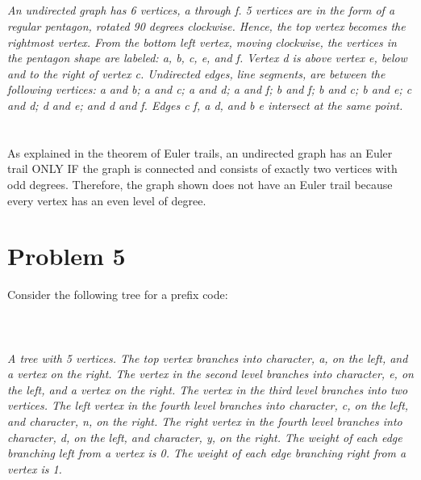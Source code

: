 \documentclass{amsart}
\theoremstyle{definition}
\theoremstyle{Exercise}
\theoremstyle{remark}
\theoremstyle{rule}
\numberwithin{equation}{section}
\begin{document}
\begin{enumerate}[label=(\alph*)]
\begin{enumerate}[label=(\roman*)]
{}
\\\\
\vspace*{0.2in}
\\\\
{\color{blue}{\bf Figure 12:} \emph{An undirected graph has 6 vertices, a through f. 5 vertices are in the form of a regular pentagon, rotated 90 degrees clockwise. Hence, the top vertex becomes the rightmost vertex. From the bottom left vertex, moving clockwise, the vertices in the pentagon shape are labeled: a, b, c, e, and f. Vertex d is above vertex e, below and to the right of vertex c. Undirected edges, line segments, are between the following vertices: a and b; a and c; a and d; a and f; b and f; b and c; b and e; c and d; d and e; and d and f. Edges c f, a d, and b e intersect at the same point.
\\
}
}
\\\\
As explained in the theorem of Euler trails, an undirected graph has an Euler trail ONLY IF the graph is connected and consists of exactly
two vertices with odd degrees. Therefore, the graph shown does not have an Euler trail because every vertex has an even level of degree.\\

\end{enumerate}
\end{enumerate}
 \newpage
\vspace*{0.2in}
\section*{Problem 5}

Consider the following tree for a prefix code:\\\\
\\\\
{\color{blue}{\bf Figure 13:} \emph{A tree with 5 vertices. The top vertex branches into character, a, on the left, and a vertex on the right. The vertex in the second level branches into character, e, on the left, and a vertex on the right. The vertex in the third level branches into two vertices. The left vertex in the fourth level branches into character, c, on the left, and character, n, on the right. The right vertex in the fourth level branches into character, d, on the left, and character, y, on the right. The weight of each edge branching left from a vertex is 0. The weight of each edge branching right from a vertex is 1.
\\
}
}
\\
\end{document}
